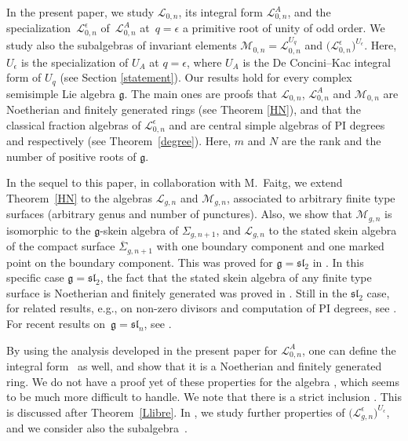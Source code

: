 \documentclass[pdftex]{sigma}
\numberwithin{equation}{section}
\theoremstyle{definition}
\newcommand{\e}{\epsilon}
\newcommand{\Ll}{{\mathcal L}}
\newcommand{\Mm}{{\mathcal M}}
\begin{document}
In the present paper, we study $\Ll_{0,n}$, its integral form $\Ll_{0,n}^A$, and the specialization~$\Ll_{0,n}^\e$ of~$\Ll_{0,n}^A$ at~$q=\e$ a primitive root of unity of odd order. We study also the subalgebras of invariant elements $\Mm_{0,n} = \Ll_{0,n}^{U_q}$ and $\bigl(\Ll_{0,n}^\e\bigr)^{U_\e}$. Here, $U_\e$ is the specialization of $U_A$ at $q=\epsilon$, where $U_A$ is the De Concini--Kac integral form of $U_q$ (see Section \ref{statement}). Our results hold for every complex semisimple Lie algebra $\mathfrak{g}$. The main ones are proofs that $\Ll_{0,n}$, $\Ll_{0,n}^A$ and $\Mm_{0,n}$ are Noetherian and finitely generated rings (see Theorem \ref{HN}), and that the classical fraction algebras of $\Ll_{0,n}^\e$ and \smash{$\bigl(\Ll_{0,n}^\e\bigr)^{U_\e}$} are central simple algebras of PI degrees  and  respectively (see Theorem~\ref{degree}). Here, $m$ and $N$ are the rank and the number of positive roots of $\mathfrak{g}$.

In the sequel \cite{BFR} to this paper, in collaboration with M.~Faitg, we extend Theorem~\ref{HN} to the algebras $\Ll_{g,n}$ and $\Mm_{g,n}$, associated to arbitrary finite type surfaces (arbitrary genus and number of punctures). Also, we show that $\Mm_{g,n}$ is isomorphic to the $\mathfrak{g}$-skein algebra of $\Sigma_{g,n+1}$, and $\Ll_{g,n}$ to the stated skein algebra of the compact surface $\overline{\Sigma}_{g,n+1}$ with one boundary component and one marked point on the boundary component. This was proved for $\mathfrak{g}={\mathfrak{sl}_2}$ in \cite{Faitg4}. In this specific case $\mathfrak{g}={\mathfrak{sl}_2}$, the fact that the stated skein algebra of any finite type surface is Noetherian and finitely generated was proved in \cite{LY}. Still in the ${\mathfrak{sl}_2}$ case, for related results, e.g., on non-zero divisors and computation of PI degrees, see \cite{BW,BW1,FKL,KK,K0,K1,KQ,Le}. For recent results on~${\mathfrak{g} ={\mathfrak{sl}_n}}$, see \cite{LeSik, Wang}.

By using the analysis developed in the present paper for $\Ll_{0,n}^A$, one can define the integral form~\smash{$\Ll_{g,n}^A$} as well, and show that it is a Noetherian and finitely generated ring. We do not have a proof yet of these properties for the algebra \smash{$\Mm_{0,n}^{A}$}, which seems to be much more difficult to handle. We note that there is a strict inclusion \smash{$\Mm_{0,n}^{A,\e} \subset \bigl(\Ll_{0,n}^\e\bigr)^{U_\e}$}. This is discussed after Theorem~\ref{Llibre}. In \cite{BFR2}, we study further properties of $\bigl(\Ll_{g,n}^\e\bigr)^{U_\e}$, and we consider also the subalgebra~\smash{$\Mm_{g,n}^{A,\e}$}.
\end{document}
